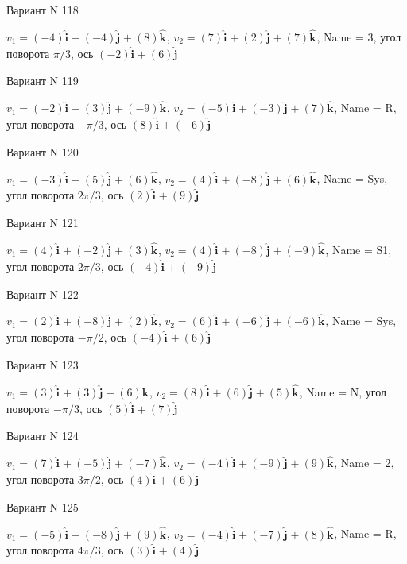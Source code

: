 \documentclass[11pt]{report}
\begin{document}
Вариант N 118

$v_1 = (-4)\mathbf{\hat{i}_{}} + (-4)\mathbf{\hat{j}_{}} + (8)\mathbf{\hat{k}_{}}$, $v_2 = (7)\mathbf{\hat{i}_{}} + (2)\mathbf{\hat{j}_{}} + (7)\mathbf{\hat{k}_{}}$, Name = 3, угол поворота $\pi / 3$, ось $(-2)\mathbf{\hat{i}_{}} + (6)\mathbf{\hat{j}_{}}$

Вариант N 119

$v_1 = (-2)\mathbf{\hat{i}_{}} + (3)\mathbf{\hat{j}_{}} + (-9)\mathbf{\hat{k}_{}}$, $v_2 = (-5)\mathbf{\hat{i}_{}} + (-3)\mathbf{\hat{j}_{}} + (7)\mathbf{\hat{k}_{}}$, Name = R, угол поворота $- \pi / 3$, ось $(8)\mathbf{\hat{i}_{}} + (-6)\mathbf{\hat{j}_{}}$

Вариант N 120

$v_1 = (-3)\mathbf{\hat{i}_{}} + (5)\mathbf{\hat{j}_{}} + (6)\mathbf{\hat{k}_{}}$, $v_2 = (4)\mathbf{\hat{i}_{}} + (-8)\mathbf{\hat{j}_{}} + (6)\mathbf{\hat{k}_{}}$, Name = Sys, угол поворота $2 \pi / 3$, ось $(2)\mathbf{\hat{i}_{}} + (9)\mathbf{\hat{j}_{}}$

Вариант N 121

$v_1 = (4)\mathbf{\hat{i}_{}} + (-2)\mathbf{\hat{j}_{}} + (3)\mathbf{\hat{k}_{}}$, $v_2 = (4)\mathbf{\hat{i}_{}} + (-8)\mathbf{\hat{j}_{}} + (-9)\mathbf{\hat{k}_{}}$, Name = S1, угол поворота $2 \pi / 3$, ось $(-4)\mathbf{\hat{i}_{}} + (-9)\mathbf{\hat{j}_{}}$

Вариант N 122

$v_1 = (2)\mathbf{\hat{i}_{}} + (-8)\mathbf{\hat{j}_{}} + (2)\mathbf{\hat{k}_{}}$, $v_2 = (6)\mathbf{\hat{i}_{}} + (-6)\mathbf{\hat{j}_{}} + (-6)\mathbf{\hat{k}_{}}$, Name = Sys, угол поворота $- \pi / 2$, ось $(-4)\mathbf{\hat{i}_{}} + (6)\mathbf{\hat{j}_{}}$

Вариант N 123

$v_1 = (3)\mathbf{\hat{i}_{}} + (3)\mathbf{\hat{j}_{}} + (6)\mathbf{\hat{k}_{}}$, $v_2 = (8)\mathbf{\hat{i}_{}} + (6)\mathbf{\hat{j}_{}} + (5)\mathbf{\hat{k}_{}}$, Name = N, угол поворота $- \pi / 3$, ось $(5)\mathbf{\hat{i}_{}} + (7)\mathbf{\hat{j}_{}}$

Вариант N 124

$v_1 = (7)\mathbf{\hat{i}_{}} + (-5)\mathbf{\hat{j}_{}} + (-7)\mathbf{\hat{k}_{}}$, $v_2 = (-4)\mathbf{\hat{i}_{}} + (-9)\mathbf{\hat{j}_{}} + (9)\mathbf{\hat{k}_{}}$, Name = 2, угол поворота $3 \pi / 2$, ось $(4)\mathbf{\hat{i}_{}} + (6)\mathbf{\hat{j}_{}}$

Вариант N 125

$v_1 = (-5)\mathbf{\hat{i}_{}} + (-8)\mathbf{\hat{j}_{}} + (9)\mathbf{\hat{k}_{}}$, $v_2 = (-4)\mathbf{\hat{i}_{}} + (-7)\mathbf{\hat{j}_{}} + (8)\mathbf{\hat{k}_{}}$, Name = R, угол поворота $4 \pi / 3$, ось $(3)\mathbf{\hat{i}_{}} + (4)\mathbf{\hat{j}_{}}$
\end{document}
